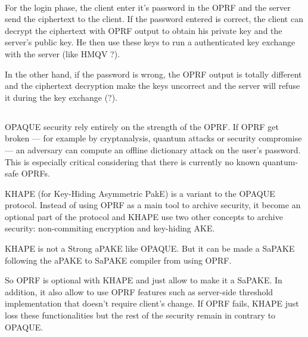 \documentclass[../report.tex]{subfiles}
\begin{document}
\paragraph{}
For the login phase, the client enter it's password in the OPRF and the server send the ciphertext to the client.
If the password entered is correct, the client can decrypt the ciphertext with OPRF output to obtain his private key and the server's public key.
He then use these keys to run a authenticated key exchange with the server (like HMQV ?).

In the other hand, if the password is wrong, the OPRF output is totally different and the ciphertext decryption make the keys uncorrect and the server will refuse it during the key exchange (?). %






\subsection{}
\paragraph{}

OPAQUE security rely entirely on the strength of the OPRF. If OPRF get broken --- for example by cryptanalysis, quantum attacks or security compromise --- an adversary can compute an offline dictionary attack on the user's password. This is especially critical considering that there is currently no known quantum-safe OPRFs.

KHAPE (for Key-Hiding Asymmetric PakE) \cite{KHAPE_Paper} is a variant to the OPAQUE protocol. Instead of using OPRF as a main tool to archive security, it become an optional part of the protocol and KHAPE use two other concepts to archive security: non-commiting encryption and key-hiding AKE. %

KHAPE is not a Strong aPAKE like OPAQUE. But it can be made a SaPAKE following the aPAKE to SaPAKE compiler from \cite{OPAQUE_Paper} using OPRF.

So OPRF is optional with KHAPE and just allow to make it a SaPAKE. In addition, it also allow to use OPRF features such as server-side threshold implementation that doesn't require client's change. If OPRF fails, KHAPE just loss these functionalities but the rest of the security remain in contrary to OPAQUE.
\end{document}
